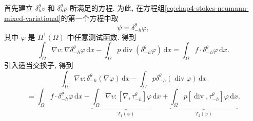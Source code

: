 \begin{Proof}
首先建立 $\delta_h^\theta v$ 和 $\delta_h^\theta p$ 所满足的方程. 为此, 在方程组\eqref{eq:chap4-stokes-neumann-mixed-variational}的第一个方程中取
\[
 \psi=\delta_{-h}^\theta\varphi,
\]
其中 $\varphi$ 是 $H^1(\Omega)$ 中任意测试函数. 得到
\[
 \int_\Omega\nabla v:\nabla\delta_{-h}^\theta\varphi\,\mathrm dx
 -\int_\Omega p\operatorname{div}(\delta_{-h}^\theta\varphi)\,\mathrm dx
 =\int_\Omega f\cdot\delta_{-h}^\theta\varphi\,\mathrm dx.
\]
引入适当交换子, 得到
\[
 \int_\Omega\nabla v:\delta_{-h}^\theta(\nabla\varphi)\,\mathrm dx
 -\int_\Omega p\delta_{-h}^\theta(\operatorname{div}\varphi)\,\mathrm dx
\]
\[
 =\int_\Omega f\cdot\delta_{-h}^\theta\varphi\,\mathrm dx
 -\underbrace{\int_\Omega\nabla v:[\nabla,\tau_{-h}^\theta]\varphi\,\mathrm dx}_{T_1(\varphi)}
 +\underbrace{\int_\Omega p[\operatorname{div},\tau_{-h}^\theta]\varphi\,\mathrm dx}_{T_2(\varphi)}.
\]


\end{Proof}
